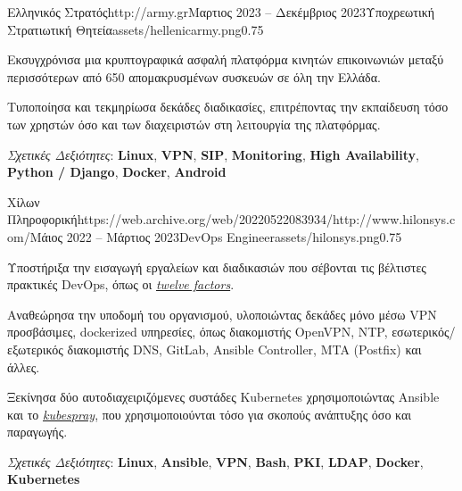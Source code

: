 \documentclass{mycv}
\begin{document}
	\vspace{0.5cm}

	\begin{EntryDatedLogo}{Ελληνικός Στρατός}{http://army.gr}{Μαρτιος 2023 -- Δεκέμβριος 2023}{Υποχρεωτική Στρατιωτική Θητεία}{assets/hellenicarmy.png}{0.75}
		\begin{Itemize}
			\item Εκσυγχρόνισα μια κρυπτογραφικά ασφαλή πλατφόρμα κινητών επικοινωνιών μεταξύ περισσότερων από 650 απομακρυσμένων συσκευών σε όλη την Ελλάδα.
			\item Τυποποίησα και τεκμηρίωσα δεκάδες διαδικασίες, επιτρέποντας την εκπαίδευση τόσο των χρηστών όσο και των διαχειριστών στη λειτουργία της πλατφόρμας.
		\end{Itemize}
		\vspace{-0.3cm}
		\textit{Σχετικές Δεξιότητες}: \textbf{Linux}, \textbf{VPN}, \textbf{SIP}, \textbf{Monitoring}, \textbf{High Availability}, \textbf{Python / Django}, \textbf{Docker}, \textbf{Android}
	\end{EntryDatedLogo}

	\vspace{0.5cm}

	\begin{EntryDatedLogo}{Χίλων Πληροφορική}{https://web.archive.org/web/20220522083934/http://www.hilonsys.com/}{Μάιος 2022 -- Μάρτιος 2023}{DevOps Engineer}{assets/hilonsys.png}{0.75}
		\begin{Itemize}
			\item Υποστήριξα την εισαγωγή εργαλείων και διαδικασιών που σέβονται τις βέλτιστες πρακτικές DevOps, όπως οι \href{https://12factor.net/}{\textit{twelve factors}}.
			\item Αναθεώρησα την υποδομή του οργανισμού, υλοποιώντας δεκάδες μόνο μέσω VPN προσβάσιμες, dockerized υπηρεσίες, όπως διακομιστής OpenVPN, NTP, εσωτερικός/εξωτερικός διακομιστής DNS, GitLab, Ansible Controller, MTA (Postfix) και άλλες.
			\item Ξεκίνησα δύο αυτοδιαχειριζόμενες συστάδες Kubernetes χρησιμοποιώντας Ansible και το \href{https://kubespray.io/}{\textit{kubespray}}, που χρησιμοποιούνται τόσο για σκοπούς ανάπτυξης όσο και παραγωγής.
		\end{Itemize}
		\vspace{-0.3cm}
		\textit{Σχετικές Δεξιότητες}: \textbf{Linux}, \textbf{Ansible}, \textbf{VPN}, \textbf{Bash}, \textbf{PKI}, \textbf{LDAP}, \textbf{Docker}, \textbf{Kubernetes}
	\end{EntryDatedLogo}
\end{document}
